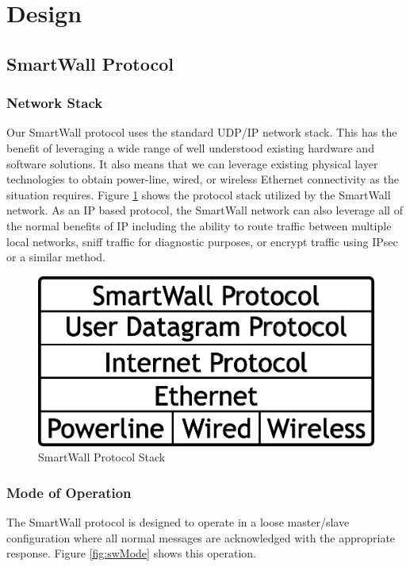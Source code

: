 \documentclass[12pt]{article}
\begin{document}
\section{Design}
\subsection{SmartWall Protocol}
\subsubsection{Network Stack}
\label{sec:Design.SmartWallProtocol.NetworkStack}
Our SmartWall protocol uses the standard UDP/IP network stack.
This has the benefit of
leveraging a wide range of well understood existing hardware and
software solutions. It also means that we can leverage existing physical layer
technologies to obtain power-line, wired, or wireless Ethernet
connectivity as the situation requires. Figure \ref{fig:swStack} shows
the protocol stack utilized by the SmartWall network. As an IP
based protocol, the SmartWall network can also leverage all of the
normal benefits of IP including the ability to route traffic between
multiple local networks, sniff traffic for diagnostic purposes, or
encrypt traffic using IPsec or a similar method.

\begin{figure}
  \begin{center}
    \includegraphics[scale=.5]{stack.pdf}
  \end{center}
  \caption{SmartWall Protocol Stack}
  \label{fig:swStack}
\end{figure}

\subsubsection{Mode of Operation}
\label{sec:Design.SmartWallProtocol.ModeofOperation}
The SmartWall protocol is designed to operate in a loose master/slave
configuration where all normal messages are acknowledged with the
appropriate response. Figure \ref{fig:swMode} shows this operation.
\end{document}
